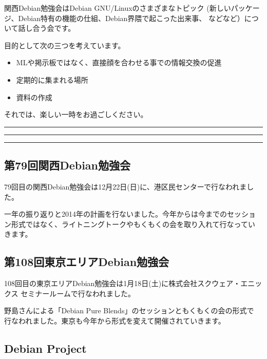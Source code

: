 \documentclass[mingoth,a4paper]{jsarticle}
\begin{document}
 関西Debian勉強会はDebian GNU/Linuxのさまざまなトピック
 (新しいパッケージ、Debian特有の機能の仕組、Debian界隈で起こった出来事、
 などなど）について話し合う会です。

 目的として次の三つを考えています。
 \begin{itemize}
  \item MLや掲示板ではなく、直接顔を合わせる事での情報交換の促進
  \item 定期的に集まれる場所
  \item 資料の作成
 \end{itemize}

 それでは、楽しい一時をお過ごしください。

\newpage

\begin{minipage}[b]{0.2\hsize}
 {}
\end{minipage}
\begin{minipage}[b]{0.8\hsize}
\hrule
\vspace{2mm}
\hrule
\setcounter{tocdepth}{1}
\tableofcontents
\vspace{2mm}
\hrule
\end{minipage}


\subsection{第79回関西Debian勉強会}

79回目の関西Debian勉強会は12月22日(日)に、港区民センターで行なわれまし
た。

一年の振り返りと2014年の計画を行ないました。今年からは今までのセッショ
ン形式ではなく、ライトニングトークやもくもくの会を取り入れて行なってい
きます。

\subsection{第108回東京エリアDebian勉強会}

108回目の東京エリアDebian勉強会は1月18日(土)に株式会社スクウェア・エニッ
クス セミナールームで行なわれました。

野島さんによる「Debian Pure Blends」のセッションともくもくの会の形式で
行なわれました。東京も今年から形式を変えて開催されていきます。

\subsection{Debian Project}
\end{document}
